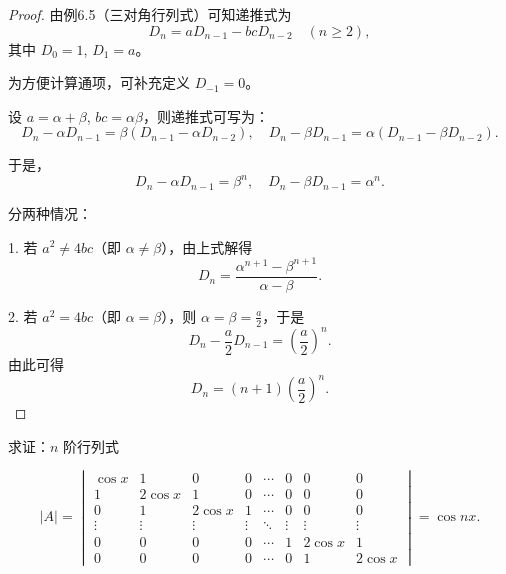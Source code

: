 \documentclass[lang=cn,12pt]{elegantbook}
\begin{document}
\begin{proof}
由例6.5（三对角行列式）可知递推式为 
\[
D_n = a D_{n-1} - bc D_{n-2} \quad (n \geq 2),
\]
其中 $D_0 = 1$, $D_1 = a$。

为方便计算通项，可补充定义 $D_{-1} = 0$。

设 $a = \alpha + \beta$, $bc = \alpha \beta$，则递推式可写为：
\[
D_n - \alpha D_{n-1} = \beta (D_{n-1} - \alpha D_{n-2}), \quad
D_n - \beta D_{n-1} = \alpha (D_{n-1} - \beta D_{n-2}).
\]

于是，
\[
D_n - \alpha D_{n-1} = \beta^n, \quad
D_n - \beta D_{n-1} = \alpha^n.
\]

分两种情况：

1. 若 $a^2 \neq 4bc$（即 $\alpha \neq \beta$），由上式解得
\[
D_n = \frac{\alpha^{n+1} - \beta^{n+1}}{\alpha - \beta}.
\]

2. 若 $a^2 = 4bc$（即 $\alpha = \beta$），则 $\alpha = \beta = \frac{a}{2}$，于是
\[
D_n - \frac{a}{2} D_{n-1} = \left(\frac{a}{2}\right)^n.
\]
由此可得
\[
D_n = (n+1) \left( \frac{a}{2} \right)^n.
\]

\end{proof}

\begin{example}
    求证：\( n \) 阶行列式
    
    \[|A| = 
    \begin{vmatrix}
    \cos x & 1 & 0 & 0 & \cdots & 0 & 0 & 0 \\
    1 & 2\cos x & 1 & 0 & \cdots & 0 & 0 & 0 \\
    0 & 1 & 2\cos x & 1 & \cdots & 0 & 0 & 0 \\
    \vdots & \vdots & \vdots & \vdots & \ddots & \vdots & \vdots & \vdots \\
    0 & 0 & 0 & 0 & \cdots & 1 & 2\cos x & 1 \\
    0 & 0 & 0 & 0 & \cdots & 0 & 1 & 2\cos x
    \end{vmatrix} = \cos nx.\]
\end{example}
\end{document}
